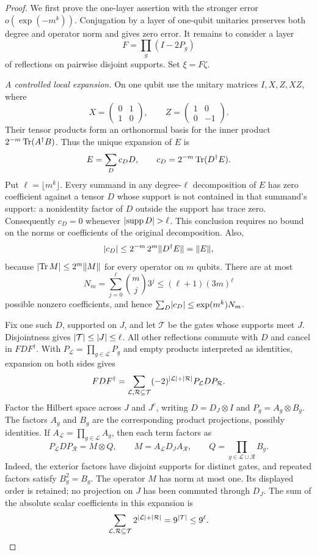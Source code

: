 \begin{proof}
We first prove the one-layer assertion with the stronger error
$o(\exp(-m^k))$.  Conjugation by a layer of one-qubit unitaries preserves
both degree and operator norm and gives zero error.  It remains to consider
a layer
\[
 F=\prod_g (I-2P_g)
\]
of reflections on pairwise disjoint supports.  Set $\xi=F\zeta$.

\emph{A controlled local expansion.}
On one qubit use the unitary matrices $I,X,Z,XZ$, where
\[
 X=\begin{pmatrix}0&1\\1&0\end{pmatrix},
 \qquad
 Z=\begin{pmatrix}1&0\\0&-1\end{pmatrix}.
\]
Their tensor products form an orthonormal basis for the inner product
$2^{-m}\operatorname{Tr}(A^\dagger B)$.  Thus the unique expansion of $E$ is
\[
 E=\sum_D c_DD,
 \qquad c_D=2^{-m}\operatorname{Tr}(D^\dagger E).
\]
Put $\ell=\lfloor m^k\rfloor$.  Every summand in any degree-$\ell$
decomposition of $E$ has zero coefficient against a tensor $D$ whose
support is not contained in that summand's support: a nonidentity factor
of $D$ outside the support has trace zero.  Consequently $c_D=0$ whenever
$\lvert\operatorname{supp} D\rvert>\ell$.  This conclusion requires no bound on the norms or
coefficients of the original decomposition.  Also,
\[
 \lvert c_D\rvert
 \le 2^{-m}\,2^m\lVert D^\dagger E\rVert
 =\lVert E\rVert,
\]
because $\lvert\operatorname{Tr} M\rvert\le 2^m\lVert M\rVert$ for every operator on $m$ qubits.
There are at most
\[
 N_m=\sum_{j=0}^{\ell}\binom mj3^j
 \le (\ell+1)(3m)^\ell
\]
possible nonzero coefficients, and hence
$\sum_D\lvert c_D\rvert\le \exp(m^k)N_m$.

Fix one such $D$, supported on $J$, and let $\mathcal T$ be the gates
whose supports meet $J$.  Disjointness gives
$\lvert\mathcal T\rvert\le\lvert J\rvert\le\ell$.  All other reflections commute with
$D$ and cancel in $FDF^\dagger$.  With
$P_{\mathcal L}=\prod_{g\in\mathcal L}P_g$ and
empty products interpreted as identities, expansion on both sides gives
\[
 FDF^\dagger
 =\sum_{\mathcal L,\mathcal R\subseteq\mathcal T}
   (-2)^{\lvert\mathcal L\rvert+\lvert\mathcal R\rvert}
   P_{\mathcal L}DP_{\mathcal R}.
\]
Factor the Hilbert space across $J$ and $J^c$, writing
$D=D_J\otimes I$ and $P_g=A_g\otimes B_g$.
The factors $A_g$ and $B_g$ are the corresponding product projections,
possibly identities.  If
$A_{\mathcal L}=\prod_{g\in\mathcal L}A_g$, then each term factors as
\[
 P_{\mathcal L}DP_{\mathcal R}=M\otimes Q,
 \qquad
 M=A_{\mathcal L}D_JA_{\mathcal R},
 \qquad
 Q=\prod_{g\in\mathcal L\cup\mathcal R}B_g.
\]
Indeed, the exterior factors have disjoint supports for distinct gates,
and repeated factors satisfy $B_g^2=B_g$.  The operator
$M$ has norm at most one.  Its displayed order is
retained; no projection on $J$ has been commuted through $D_J$.
The sum of the absolute scalar coefficients in this expansion is
\[
 \sum_{\mathcal L,\mathcal R\subseteq\mathcal T}
  2^{\lvert\mathcal L\rvert+\lvert\mathcal R\rvert}
 =9^{\lvert\mathcal T\rvert}\le 9^\ell.
\]


\end{proof}

